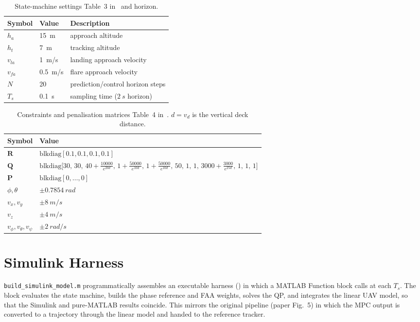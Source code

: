 \documentclass[12pt,a4paper]{report}
\begin{document}
\begin{table}[H]
\centering
\caption{State-machine settings Table~3 in~\cite{prochazka2024} and horizon.}
\label{tab:t3}
\begin{tabular}{lll}
\toprule
Symbol & Value & Description \\
\midrule
$h_a$ & \SI{15}{m} & approach altitude\\
$h_t$ & \SI{7}{m} & tracking altitude\\
$v_{la}$ & \SI{1}{m/s} & landing approach velocity\\
$v_{fa}$ & \SI{0.5}{m/s} & flare approach velocity\\
$N$ & 20 & prediction/control horizon steps\\
$T_s$ & \SI{0.1}{s} & sampling time ($\SI{2}{s}$ horizon)\\
\bottomrule
\end{tabular}
\end{table}

\begin{table}[H]
\centering
\caption{Constraints and penalisation matrices Table~4 in~\cite{prochazka2024}. $d=v_d$ is the vertical deck distance.}
\label{tab:t4}
\begin{tabular}{ll}
\toprule
Symbol & Value \\
\midrule
$\bm{R}$ & $\mathrm{blkdiag}[0.1,0.1,0.1,0.1]$\\
$\bm{Q}$ & $\mathrm{blkdiag}\big[30,\,30,\,40+\tfrac{10000}{e^{20d}},\,1+\tfrac{50000}{e^{10d}},\,1+\tfrac{50000}{e^{10d}},\,50,\,1,\,1,\,3000+\tfrac{3000}{e^{25d}},\,1,\,1,\,1\big]$\\
$\bm{P}$ & $\mathrm{blkdiag}[0,\dots,0]$\\
$\phi,\theta$ & $\pm\SI{0.7854}{rad}$\\
$v_x,v_y$ & $\pm\SI{8}{m/s}$\\
$v_z$ & $\pm\SI{4}{m/s}$\\
$v_\phi,v_\theta,v_\psi$ & $\pm\SI{2}{rad/s}$\\
\bottomrule
\end{tabular}
\end{table}

\section{Simulink Harness}


\texttt{build\_simulink\_model.m} programmatically assembles an executable harness
() in which a MATLAB Function block calls
 at each $T_s$. The block evaluates the state machine,
builds the phase reference and FAA weights, solves the QP, and integrates the linear UAV
model, so that the Simulink and pure-MATLAB results coincide. This mirrors the original
pipeline (paper Fig.~5) in which the MPC output is converted to a trajectory through the
linear model and handed to the reference tracker.
\end{document}
